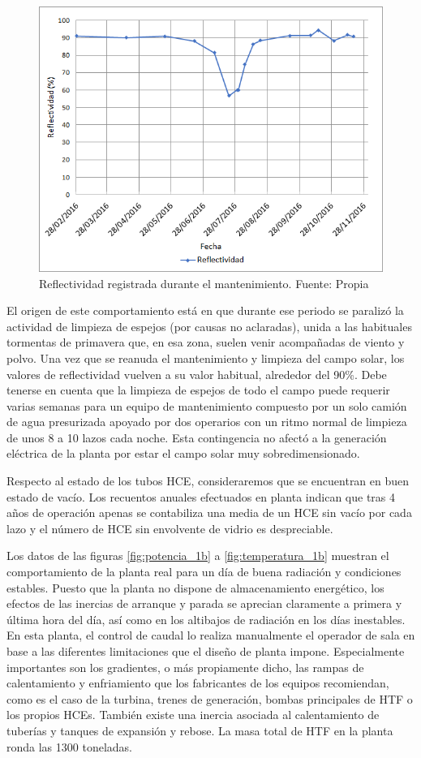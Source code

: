 \begin{figure}[h!]
\includegraphics[width=0.9\linewidth]{images/reflectividad.png}
\caption{Reflectividad registrada durante el mantenimiento. Fuente: Propia} 
\label{fig:reflectividad}
\end{figure}

El origen de este comportamiento está en que durante ese periodo se paralizó la actividad de limpieza de espejos (por causas no aclaradas), unida a las habituales tormentas de primavera que, en esa zona, suelen venir acompañadas de viento y polvo. Una vez que se reanuda el mantenimiento y limpieza del campo solar, los valores de reflectividad vuelven a su valor habitual, alrededor del 90\%. Debe tenerse en cuenta que la limpieza de espejos de todo el campo puede requerir varias semanas para un equipo de mantenimiento compuesto por un solo camión de agua presurizada apoyado por dos operarios con un ritmo normal de limpieza de unos 8 a 10 lazos cada noche. Esta contingencia no afectó a la generación eléctrica de la planta por estar  el campo solar muy sobredimensionado.

Respecto al estado de los tubos HCE, consideraremos que se encuentran en buen estado de vacío. Los recuentos anuales efectuados en planta indican que tras 4 años de operación apenas se contabiliza una media de un HCE sin vacío por cada lazo y el número de HCE sin envolvente de vidrio es despreciable.

Los datos de las figuras \ref{fig:potencia_1b} a \ref{fig:temperatura_1b} muestran el comportamiento de la planta real para un día de buena radiación y condiciones estables. Puesto que la planta no dispone de almacenamiento energético, los efectos de las inercias de arranque y parada se aprecian claramente a primera y última hora del día, así como en los altibajos de radiación en los días inestables. En esta planta, el control de caudal lo realiza manualmente el operador de sala en base a las diferentes limitaciones que el diseño de planta impone. Especialmente importantes son los gradientes, o más propiamente dicho, las rampas de calentamiento y enfriamiento que los fabricantes de los equipos recomiendan, como es el caso de la turbina, trenes de generación, bombas principales de HTF o los propios HCEs. También existe una inercia asociada al calentamiento de tuberías y tanques de expansión y rebose.  La masa total de HTF en la planta ronda las 1300 toneladas. 

